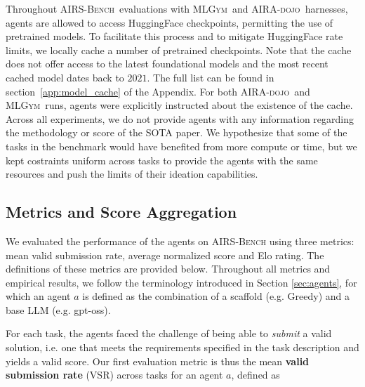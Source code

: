 \documentclass{fairmeta}
\newcommand{\airsbench}{\textsc{AIRS-Bench}}
\newcommand{\airadojo}{\textsc{AIRA-dojo}}
\newcommand{\mlgym}{\textsc{MLGym}}
\begin{document}

Throughout \airsbench~evaluations with \mlgym~and \airadojo~harnesses, agents are allowed to access HuggingFace checkpoints, permitting the use of pretrained models. To facilitate this process and to mitigate HuggingFace rate limits, we locally cache a number of pretrained checkpoints. Note that the cache does not offer access to the latest foundational models and the most recent cached model dates back to $2021$. The full list can be found in section~\ref{app:model_cache} of the Appendix. For both \airadojo~and \mlgym~runs, agents were explicitly instructed about the existence of the cache.
Across all experiments, we do not provide agents with any information regarding the methodology or score of the SOTA paper. We hypothesize that some of the tasks in the benchmark would have benefited from more compute or time, but we kept costraints uniform across tasks to provide the agents with the same resources and push the limits of their ideation capabilities.

\subsection{Metrics and Score Aggregation}
\label{sec:metrics}

We evaluated the performance of the agents on \airsbench{} using three metrics: mean valid submission rate, average normalized score and Elo rating. The definitions of these metrics are provided below. Throughout all metrics and empirical results, we follow the terminology introduced in Section \ref{sec:agents}, for which an agent $a$ is defined as the combination of a scaffold (e.g. Greedy) and a base LLM (e.g. gpt-oss).

For each task, the agents faced the challenge of being able to \textit{submit} a valid solution, i.e. one that meets the requirements specified in the task description and yields a valid score. Our first evaluation metric is thus the mean \textbf{valid submission rate} (VSR) across tasks for an agent $a$, defined as
\end{document}
